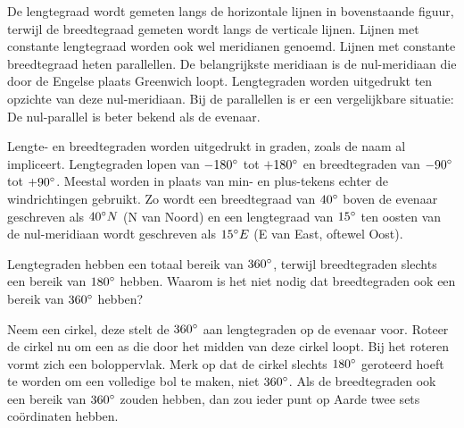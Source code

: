 De lengtegraad wordt gemeten langs de horizontale lijnen in bovenstaande figuur, terwijl de breedtegraad gemeten wordt langs de verticale lijnen. Lijnen met constante lengtegraad worden ook wel meridianen genoemd. Lijnen met constante breedtegraad heten parallellen. De belangrijkste meridiaan is de nul-meridiaan die door de Engelse plaats Greenwich loopt. Lengtegraden worden uitgedrukt ten opzichte van deze nul-meridiaan. Bij de parallellen is er een vergelijkbare situatie: De nul-parallel is beter bekend als de evenaar.

Lengte- en breedtegraden worden uitgedrukt in graden, zoals de naam al impliceert. Lengtegraden lopen van $-180\degree$ tot $+180\degree$ en breedtegraden van $-90\degree$ tot $+90\degree$. Meestal worden in plaats van min- en plus-tekens echter de windrichtingen gebruikt. Zo wordt een breedtegraad van $40\degree$ boven de evenaar geschreven als $40\degree N$ (N van Noord) en een lengtegraad van $15\degree$ ten oosten van de nul-meridiaan wordt geschreven als $15\degree E$ (E van East, oftewel Oost).

\begin{opgave}
	Lengtegraden hebben een totaal bereik van $360\degree$, terwijl breedtegraden slechts een bereik van $180\degree$ hebben. Waarom is het niet nodig dat breedtegraden ook een bereik van $360\degree$ hebben?
	\begin{antwoord}
		Neem een cirkel, deze stelt de $360\degree$ aan lengtegraden op de evenaar voor. Roteer de cirkel nu om een as die door het midden van deze cirkel loopt. Bij het roteren vormt zich een boloppervlak. Merk op dat de cirkel slechts $180\degree$ geroteerd hoeft te worden om een volledige bol te maken, niet $360\degree$. Als de breedtegraden ook een bereik van $360\degree$ zouden hebben, dan zou ieder punt op Aarde twee sets co\"ordinaten hebben.
	\end{antwoord}
\end{opgave}

